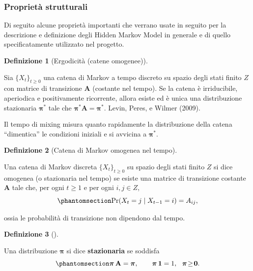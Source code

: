 \documentclass[
  italian,
  a4paper,
  a4paper,
  twoside,
  open=right,
  12pt]{scrbook}
\theoremstyle{definition}
\newtheorem{definition}{Definizione}[chapter]
\theoremstyle{remark}
\begin{document}
\subsubsection{Proprietà strutturali}\label{proprietuxe0-strutturali}

Di seguito alcune proprietà importanti che verrano usate in seguito per
la descrizione e definizione degli Hidden Markov Model in generale e di
quello specificatamente utilizzato nel progetto.

\begin{definition}[Ergodicità (catene
omogenee)]\protect\hypertarget{def-ergodicity}{}\label{def-ergodicity}

Sia \(\{X_t\}_{t\ge 0}\) una catena di Markov a tempo discreto su spazio
degli stati finito \(Z\) con matrice di transizione \(\mathbf{A}\)
(costante nel tempo). Se la catena è irriducibile, aperiodica e
positivamente ricorrente, allora esiste ed è unica una distribuzione
stazionaria \(\boldsymbol{\pi}^*\) tale che
\(\boldsymbol{\pi}^* \mathbf{A} = \boldsymbol{\pi}^*\). Levin, Peres, e
Wilmer (2009).

\end{definition}

Il tempo di mixing misura quanto rapidamente la distribuzione della
catena ``dimentica'' le condizioni iniziali e si avvicina a
\(\boldsymbol{\pi}^*\).

\begin{definition}[Catena di Markov omogenea nel
tempo]\protect\hypertarget{def-homogeneous}{}\label{def-homogeneous}

Una catena di Markov discreta \(\{X_t\}_{t \ge 0}\) su spazio degli
stati finito \(Z\) si dice omogenea (o stazionaria nel tempo) se esiste
una matrice di transizione costante \(\mathbf{A}\) tale che, per ogni
\(t \ge 1\) e per ogni \(i,j \in Z\),
\begin{equation}\phantomsection\label{eq-matrice_costante}{
\Pr(X_t = j \mid X_{t-1} = i) = A_{ij},
}\end{equation}

ossia le probabilità di transizione non dipendono dal tempo.

\end{definition}

\begin{definition}[]\protect\hypertarget{def-stazionaria}{}\label{def-stazionaria}

Una distribuzione \(\boldsymbol{\pi}\) si dice \textbf{stazionaria} se
soddisfa \begin{equation}\phantomsection\label{eq-stazionaria}{
\boldsymbol{\pi}\,\mathbf{A} = \boldsymbol{\pi}, \qquad \boldsymbol{\pi}\,\mathbf{1} = 1,\ \ \boldsymbol{\pi}\!\ge\! \mathbf{0}.
}\end{equation}

\end{definition}
\end{document}
